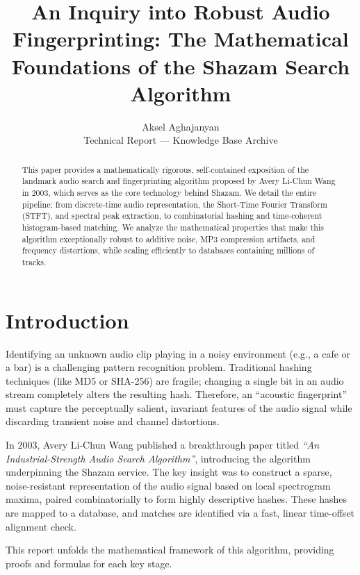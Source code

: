\documentclass[11pt,journal,onecolumn]{IEEEtran}
\begin{document}
\title{An Inquiry into Robust Audio Fingerprinting: The Mathematical Foundations of the Shazam Search Algorithm}

\author{Aksel Aghajanyan \\ \small Technical Report --- Knowledge Base Archive}

\maketitle

\begin{abstract}
This paper provides a mathematically rigorous, self-contained exposition of the landmark audio search and fingerprinting algorithm proposed by Avery Li-Chun Wang in 2003, which serves as the core technology behind Shazam. We detail the entire pipeline: from discrete-time audio representation, the Short-Time Fourier Transform (STFT), and spectral peak extraction, to combinatorial hashing and time-coherent histogram-based matching. We analyze the mathematical properties that make this algorithm exceptionally robust to additive noise, MP3 compression artifacts, and frequency distortions, while scaling efficiently to databases containing millions of tracks.
\end{abstract}

\section{Introduction}
Identifying an unknown audio clip playing in a noisy environment (e.g., a cafe or a bar) is a challenging pattern recognition problem. Traditional hashing techniques (like MD5 or SHA-256) are fragile; changing a single bit in an audio stream completely alters the resulting hash. Therefore, an ``acoustic fingerprint'' must capture the perceptually salient, invariant features of the audio signal while discarding transient noise and channel distortions.

In 2003, Avery Li-Chun Wang published a breakthrough paper titled \textit{``An Industrial-Strength Audio Search Algorithm''}, introducing the algorithm underpinning the Shazam service. The key insight was to construct a sparse, noise-resistant representation of the audio signal based on local spectrogram maxima, paired combinatorially to form highly descriptive hashes. These hashes are mapped to a database, and matches are identified via a fast, linear time-offset alignment check.

This report unfolds the mathematical framework of this algorithm, providing proofs and formulas for each key stage.
\end{document}
